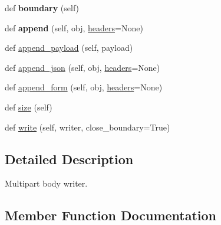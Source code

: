 \begin{DoxyCompactItemize}
def {\bfseries boundary} (self)
\item 
\mbox{\label{classaiohttp_1_1multipart_1_1_multipart_writer_ac749e7f81c2ea6b4dc973a41a14c6c82}} 
def {\bfseries append} (self, obj, \hyperlink{classaiohttp_1_1payload_1_1_payload_a2a53edff1dc2e83f11fb952f4471426d}{headers}=None)
\item 
def \hyperlink{classaiohttp_1_1multipart_1_1_multipart_writer_a8a5a821be4573c2f92bab6a0b84e09a3}{append\+\_\+payload} (self, payload)
\item 
def \hyperlink{classaiohttp_1_1multipart_1_1_multipart_writer_acac3d6614a647dab7d337c3539907718}{append\+\_\+json} (self, obj, \hyperlink{classaiohttp_1_1payload_1_1_payload_a2a53edff1dc2e83f11fb952f4471426d}{headers}=None)
\item 
def \hyperlink{classaiohttp_1_1multipart_1_1_multipart_writer_ae38cdc05a79873a3dcd17e15155c605b}{append\+\_\+form} (self, obj, \hyperlink{classaiohttp_1_1payload_1_1_payload_a2a53edff1dc2e83f11fb952f4471426d}{headers}=None)
\item 
def \hyperlink{classaiohttp_1_1multipart_1_1_multipart_writer_a7a99085cc43de729f8b918a25a367842}{size} (self)
\item 
def \hyperlink{classaiohttp_1_1multipart_1_1_multipart_writer_a6ecad8771e11380e61ff94b8ca9e5a4d}{write} (self, writer, close\+\_\+boundary=True)
\end{DoxyCompactItemize}


\subsection{Detailed Description}
\begin{DoxyVerb}Multipart body writer.\end{DoxyVerb}
 

\subsection{Member Function Documentation}
\mbox{\label{classaiohttp_1_1multipart_1_1_multipart_writer_ae38cdc05a79873a3dcd17e15155c605b}} 
